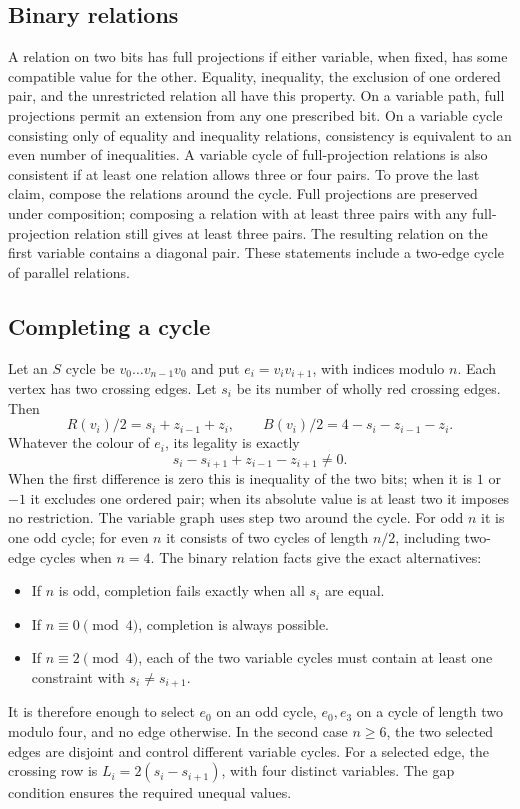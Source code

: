\subsection{Binary relations}

A relation on two bits has full projections if either variable, when
fixed, has some compatible value for the other. Equality, inequality,
the exclusion of one ordered pair, and the unrestricted relation all
have this property. On a variable path, full projections permit an
extension from any one prescribed bit. On a variable cycle consisting
only of equality and inequality relations, consistency is equivalent
to an even number of inequalities. A variable cycle of full-projection
relations is also consistent if at least one relation allows three or
four pairs. To prove the last claim, compose the relations around the
cycle. Full projections are preserved under composition; composing a
relation with at least three pairs with any full-projection relation
still gives at least three pairs. The resulting relation on the first
variable contains a diagonal pair. These statements include a two-edge
cycle of parallel relations.

\subsection{Completing a cycle}

Let an $S$ cycle be $v_0\ldots v_{n-1}v_0$ and put $e_i=v_iv_{i+1}$,
with indices modulo $n$. Each vertex has two crossing edges. Let $s_i$
be its number of wholly red crossing edges. Then
\[
 R(v_i)/2=s_i+z_{i-1}+z_i,
 \qquad B(v_i)/2=4-s_i-z_{i-1}-z_i.
\]
Whatever the colour of $e_i$, its legality is exactly
\begin{equation}\label{eq:cyclebits}
 s_i-s_{i+1}+z_{i-1}-z_{i+1}\ne0.
\end{equation}
When the first difference is zero this is inequality of the two bits;
when it is $1$ or $-1$ it excludes one ordered pair; when its absolute
value is at least two it imposes no restriction. The variable graph
uses step two around the cycle. For odd $n$ it is one odd cycle; for
even $n$ it consists of two cycles of length $n/2$, including two-edge
cycles when $n=4$. The binary relation facts give the exact alternatives:
\begin{itemize}
\item If $n$ is odd, completion fails exactly when all $s_i$ are equal.
\item If $n\equiv0\pmod4$, completion is always possible.
\item If $n\equiv2\pmod4$, each of the two variable cycles must contain
at least one constraint with $s_i\ne s_{i+1}$.
\end{itemize}
It is therefore enough to select $e_0$ on an odd cycle, $e_0,e_3$ on a
cycle of length two modulo four, and no edge otherwise. In the second
case $n\ge6$, the two selected edges are disjoint and control different
variable cycles. For a selected edge, the crossing row is
$L_i=2(s_i-s_{i+1})$, with four distinct variables. The gap condition
ensures the required unequal values.

